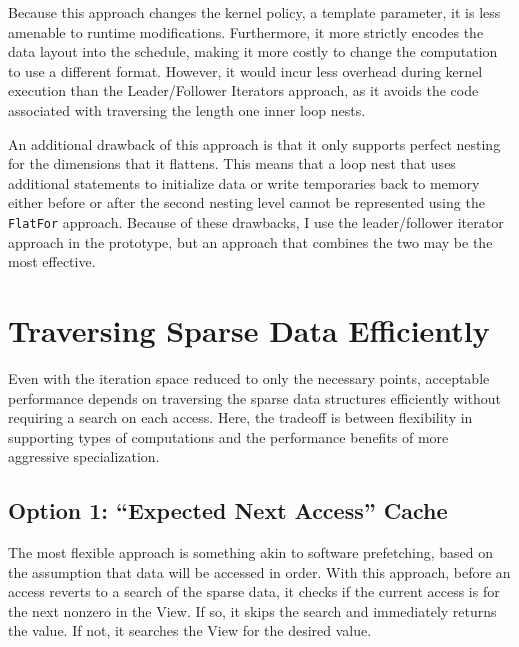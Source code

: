 Because this approach changes the kernel policy, a template parameter, it is less amenable to runtime modifications. 
Furthermore, it more strictly encodes the data layout into the schedule, making it more costly to change the computation to use a different format.
However, it would incur less overhead during kernel execution than the Leader/Follower Iterators approach, as it avoids the code associated with traversing the length one inner loop nests.

An additional drawback of this approach is that it only supports perfect nesting for the dimensions that it flattens. 
This means that a loop nest that uses additional statements to initialize data or write temporaries back to memory either before or after the second nesting level cannot be represented using the \verb.FlatFor. approach.
Because of these drawbacks, I use the leader/follower iterator approach in the prototype, but an approach that combines the two may be the most effective.


\section{Traversing Sparse Data Efficiently}
\label{sec:SparseAccess}
Even with the iteration space reduced to only the necessary points, acceptable performance depends on traversing the sparse data structures efficiently without requiring a search on each access.
Here, the tradeoff is between flexibility in supporting types of computations and the performance benefits of more aggressive specialization.

\subsection{Option 1: ``Expected Next Access'' Cache}

The most flexible approach is something akin to software prefetching, based on the assumption that data will be accessed in order. 
With this approach, before an access reverts to a search of the sparse data, it checks if the current access is for the next nonzero in the View.
If so, it skips the search and immediately returns the value.
If not, it searches the View for the desired value.


